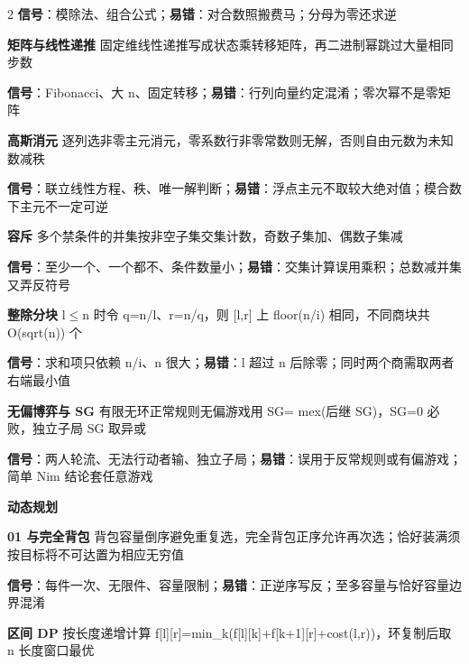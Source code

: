 \documentclass[UTF8,fontset=fandol,a4paper,twoside]{ctexart}
\newcommand{\topic}[1]{\par\smallskip\textbf{#1}\par\nobreak}
\begin{document}
\begin{multicols}{2}
\textbf{信号}：模除法、组合公式；\textbf{易错}：对合数照搬费马；分母为零还求逆\par
\par\textbf{矩阵与线性递推}\quad
固定维线性递推写成状态乘转移矩阵，再二进制幂跳过大量相同步数\par
\textbf{信号}：Fibonacci、大 n、固定转移；\textbf{易错}：行列向量约定混淆；零次幂不是零矩阵\par
\par\textbf{高斯消元}\quad
逐列选非零主元消元，零系数行非零常数则无解，否则自由元数为未知数减秩\par
\textbf{信号}：联立线性方程、秩、唯一解判断；\textbf{易错}：浮点主元不取较大绝对值；模合数下主元不一定可逆\par
\par\textbf{容斥}\quad
多个禁条件的并集按非空子集交集计数，奇数子集加、偶数子集减\par
\textbf{信号}：至少一个、一个都不、条件数量小；\textbf{易错}：交集计算误用乘积；总数减并集又弄反符号\par
\par\textbf{整除分块}\quad
l\ensuremath{\le}n 时令 q=\allowbreak{}n/\allowbreak{}l、r=\allowbreak{}n/\allowbreak{}q，则 [\allowbreak{}l,\allowbreak{}r]\allowbreak{} 上 floor(\allowbreak{}n/\allowbreak{}i)\allowbreak{} 相同，不同商块共 O(\allowbreak{}sqrt(\allowbreak{}n)\allowbreak{})\allowbreak{} 个\par
\textbf{信号}：求和项只依赖 n/\allowbreak{}i、n 很大；\textbf{易错}：l 超过 n 后除零；同时两个商需取两者右端最小值\par
\par\textbf{无偏博弈与 SG}\quad
有限无环正常规则无偏游戏用 SG=\allowbreak{} mex(\allowbreak{}后继 SG)\allowbreak{}，SG=\allowbreak{}0 必败，独立子局 SG 取异或\par
\textbf{信号}：两人轮流、无法行动者输、独立子局；\textbf{易错}：误用于反常规则或有偏游戏；简单 Nim 结论套任意游戏\par
\topic{动态规划}
\par\textbf{01 与完全背包} 背包容量倒序避免重复选，完全背包正序允许再次选；恰好装满须按目标将不可达置为相应无穷值\par
\textbf{信号}：每件一次、无限件、容量限制；\textbf{易错}：正逆序写反；至多容量与恰好容量边界混淆\par
\par\textbf{区间 DP}\quad
按长度递增计算 f[\allowbreak{}l]\allowbreak{}[\allowbreak{}r]\allowbreak{}=\allowbreak{}min\_k(\allowbreak{}f[\allowbreak{}l]\allowbreak{}[\allowbreak{}k]\allowbreak{}+\allowbreak{}f[\allowbreak{}k+\allowbreak{}1]\allowbreak{}[\allowbreak{}r]\allowbreak{}+\allowbreak{}cost(\allowbreak{}l,\allowbreak{}r)\allowbreak{})\allowbreak{}，环复制后取 n 长度窗口最优\par

\end{multicols}
\end{document}
